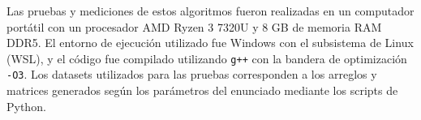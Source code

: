 Las pruebas y mediciones de estos algoritmos fueron realizadas en un computador portátil con un procesador AMD Ryzen 3 7320U y 8 GB de memoria RAM DDR5. El entorno de ejecución utilizado fue Windows con el subsistema de Linux (WSL), y el código fue compilado utilizando \texttt{g++} con la bandera de optimización \texttt{-O3}. Los datasets utilizados para las pruebas corresponden a los arreglos y matrices generados según los parámetros del enunciado mediante los scripts de Python.